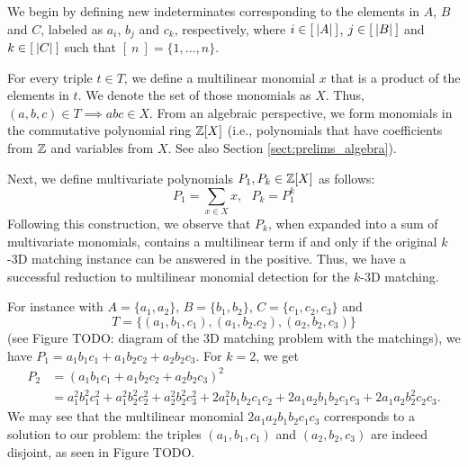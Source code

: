 We begin by defining new indeterminates corresponding to the elements in $A$, $B$ and $C$, 
labeled as $a_i$, $b_j$ and $c_k$, respectively, where $i\in [\:{\left\vert A\right\vert}\:]$, $j\in
[\:{\left\vert B\right\vert}\:]$ and $k\in [\:{\left\vert C\right\vert}\:]$ such that $[\:n\:] = \{1,\ldots,n\}$. 

For every triple $t \in T$, we define a multilinear monomial $x$ that is a
product of the elements in $t$. 
We denote the set of those monomials as $X$. 
Thus, $(a,b,c) \in T \implies abc \in X$.
From an algebraic perspective, we form monomials in the commutative polynomial 
ring $\mathbb Z[X]$ (i.e., polynomials that have coefficients from $\mathbb Z$ and variables from $X$. 
See also Section \ref{sect:prelims_algebra}). 

Next, we define multivariate polynomials
{$P_1, P_k \in \mathbb Z[X]$}
as follows: 
\[
  P_1 = \displaystyle \sum_{x \in X}x, \: \: \: P_k = P_1^k
\]
Following this construction, we observe that $P_k$, 
when expanded into a sum of multivariate monomials, 
contains a multilinear term if and only if the original 
$k$-3D matching instance can be answered in the positive. 
Thus, we have a successful reduction to 
multilinear monomial detection for the $k$-3D matching. 

For instance with $A = \{a_1, a_2\}$, $B = \{b_1, b_2\}$, $C = \{c_1, c_2,
c_3\}$ and 
\[
  T = \{(a_1, b_1, c_1), (a_1, b_2. c_2), (a_2, b_2, c_3)\}
\]
(see Figure TODO: diagram of the 3D matching problem with the matchings), 
we have $P_1 = a_1b_1c_1 + a_1b_2c_2 + a_2b_2c_3$. For $k=2$, we get 
\begin{align*}
  P_2 &= (a_1b_1c_1 + a_1b_2c_2 + a_2b_2c_3)^2 \\%
  &= a_1^2b_1^2c_1^2 + a_1^2b_2^2c_2^2 + a_2^2b_2^2c_3^2 + 
  2a_1^2b_1b_2c_1c_2 + 2a_1a_2b_1b_2c_1c_3 + 2 a_1a_2b_2^2c_2c_3.
\end{align*}
We may see that the multilinear monomial $2a_1a_2b_1b_2c_1c_3$ corresponds 
to a solution to our problem: the triples $(a_1,b_1,c_1)$ and $(a_2,b_2,c_3)$ are 
indeed disjoint, as seen in Figure TODO.

